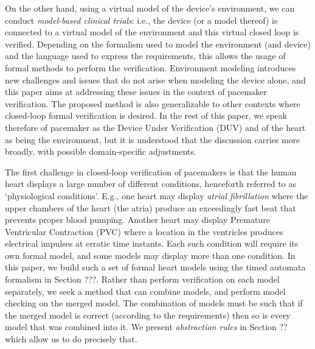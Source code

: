 On the other hand, using a virtual model of the device's environment, we can conduct \emph{model-based clinical trials}: i.e., the device (or a model thereof) is connected to a virtual model of the environment and this virtual closed loop is verified.
Depending on the formalism used to model the environment (and device) and the language used to express the requirements, this allows the usage of formal methods to perform the verification.
Environment modeling introduces new challenges and issues that do not arise when modeling the device alone, and this paper aims at addressing these issues in the context of pacemaker verification.
The proposed method is also generalizable to other contexts where closed-loop formal verification is desired.
In the rest of this paper, we speak therefore of pacemaker as the Device Under Verification (DUV) and of the heart as being the environment, but it is understood that the discussion carries more broadly, with possible domain-specific adjustments.

The first challenge in closed-loop verification of pacemakers is that the human heart displays a large number of different conditions, henceforth referred to as `physiological conditions'.
E.g., one heart may display \emph{atrial fibrillation} where the upper chambers of the heart (the atria) produce an exceedingly fast beat that prevents proper blood pumping.
Another heart may display Premature Ventricular Contraction (PVC) where a location in the ventricles produces electrical impulses at erratic time instants.
Each such condition will require its own formal model, and some models may display more than one condition.
In this paper, we build such a set of formal heart models using the timed automata formalism in Section ???.
Rather than perform verification on each model separately, we seek a method that can combine models, and perform model checking on the merged model. 
The combination of models must be such that if the merged model is correct (according to the requirements) then so is every model that was combined into it.
We present \emph{abstraction rules} in Section ?? which allow us to do precisely that.

